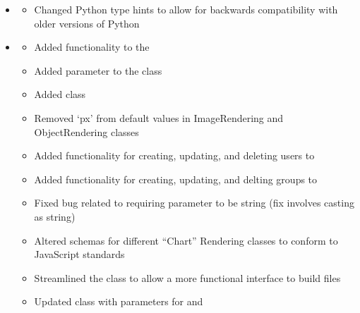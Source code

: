 \documentclass[letterpaper,10pt,english]{sphinxmanual}
\begin{document}
\begin{itemize}
\begin{description}
\begin{itemize}
\end{itemize}

\end{description}

\item {} \begin{description}
\begin{itemize}
\item {} 
\sphinxAtStartPar
Changed Python type hints to allow for backwards compatibility with older versions of Python

\end{itemize}

\end{description}

\item {} \begin{description}
\begin{itemize}
\item {} 
\sphinxAtStartPar
Added functionality to the 

\item {} 
\sphinxAtStartPar
Added  parameter to the  class

\item {} 
\sphinxAtStartPar
Added  class

\item {} 
\sphinxAtStartPar
Removed ‘px’ from default values in ImageRendering and ObjectRendering classes

\item {} 
\sphinxAtStartPar
Added functionality for creating, updating, and deleting users to 

\item {} 
\sphinxAtStartPar
Added functionality for creating, updating, and delting groups to 

\item {} 
\sphinxAtStartPar
Fixed bug related to requiring  parameter to be string (fix involves casting as string)

\item {} 
\sphinxAtStartPar
Altered schemas for different “Chart” Rendering classes to conform to JavaScript standards

\item {} 
\sphinxAtStartPar
Streamlined the  class to allow a more functional interface to build  files

\item {} 
\sphinxAtStartPar
Updated  class with parameters for  and 

\end{itemize}

\end{description}

\end{itemize}
\end{document}
